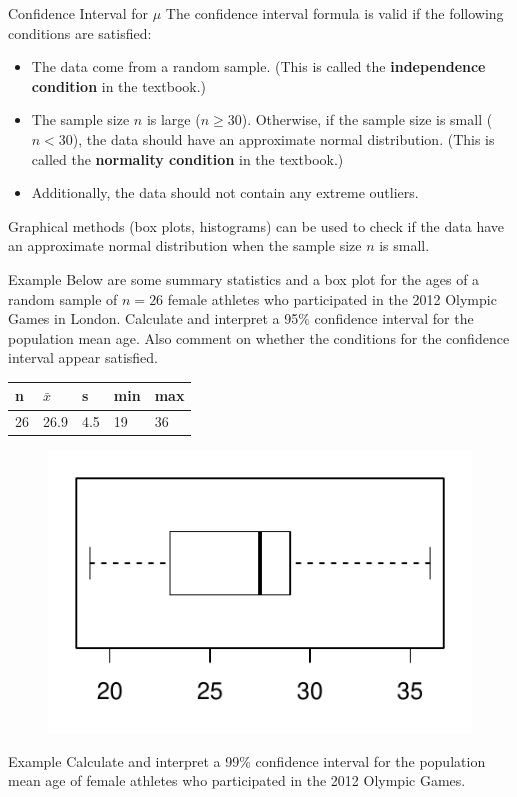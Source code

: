 \documentclass[fleqn, 10pt]{beamer}\usepackage[]{graphicx}\usepackage[]{color}
\begin{document}
\begin{frame}{Confidence Interval for $\mu$}
The confidence interval formula is valid if the following conditions are satisfied:
\vspace{5pt}
\begin{itemize}
\item The data come from a random sample.  (This is called the \textbf{independence condition} in the textbook.)
\vspace{5pt}
\item The sample size $n$ is large ($n \geq 30$).  Otherwise, if the sample size is small ($n < 30$), the data should have an approximate normal distribution. (This is called the \textbf{normality condition} in the textbook.)
\vspace{5pt}
\item Additionally, the data should not contain any extreme outliers.
\end{itemize}
\vspace{5pt}
Graphical methods (box plots, histograms) can be used to check if the data have an approximate normal distribution when the sample size $n$ is small.
\end{frame}

\begin{frame}{Example}
\vspace{-1cm}
\small
Below are some summary statistics and a box plot for the ages of a random sample of $n=26$ female athletes who participated in the 2012 Olympic Games in London.  Calculate and interpret a 95\% confidence interval for the population mean age.  Also comment on whether the conditions for the confidence interval appear satisfied.
\begin{table}[ht]
\begin{tabular}{lllll}
\hline
n & $\bar{x}$ & s & min & max\\
\hline
26 & 26.9 & 4.5 & 19 & 36
\end{tabular}
\end{table}
\vspace{-0.5cm}
\begin{figure}
\includegraphics[scale=0.5]{figure/age_boxplot.pdf}
\end{figure}
\end{frame}

\begin{frame}
\end{frame}

\begin{frame}{Example}
\vspace{-4cm}
Calculate and interpret a 99\% confidence interval for the population mean age of female athletes who participated in the 2012 Olympic Games.
\end{frame}
\end{document}
